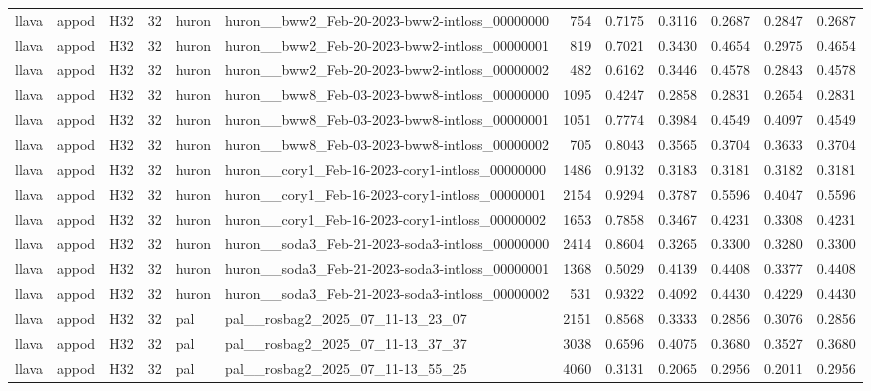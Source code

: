 \begin{table}[tbp]
\begin{tabular}{lllrllrrrrrr}
llava & appod & H32 & 32 & huron & huron\_\_bww2\_Feb-20-2023-bww2-intloss\_00000000 & 754 & 0.7175 & 0.3116 & 0.2687 & 0.2847 & 0.2687 \\
llava & appod & H32 & 32 & huron & huron\_\_bww2\_Feb-20-2023-bww2-intloss\_00000001 & 819 & 0.7021 & 0.3430 & 0.4654 & 0.2975 & 0.4654 \\
llava & appod & H32 & 32 & huron & huron\_\_bww2\_Feb-20-2023-bww2-intloss\_00000002 & 482 & 0.6162 & 0.3446 & 0.4578 & 0.2843 & 0.4578 \\
llava & appod & H32 & 32 & huron & huron\_\_bww8\_Feb-03-2023-bww8-intloss\_00000000 & 1095 & 0.4247 & 0.2858 & 0.2831 & 0.2654 & 0.2831 \\
llava & appod & H32 & 32 & huron & huron\_\_bww8\_Feb-03-2023-bww8-intloss\_00000001 & 1051 & 0.7774 & 0.3984 & 0.4549 & 0.4097 & 0.4549 \\
llava & appod & H32 & 32 & huron & huron\_\_bww8\_Feb-03-2023-bww8-intloss\_00000002 & 705 & 0.8043 & 0.3565 & 0.3704 & 0.3633 & 0.3704 \\
llava & appod & H32 & 32 & huron & huron\_\_cory1\_Feb-16-2023-cory1-intloss\_00000000 & 1486 & 0.9132 & 0.3183 & 0.3181 & 0.3182 & 0.3181 \\
llava & appod & H32 & 32 & huron & huron\_\_cory1\_Feb-16-2023-cory1-intloss\_00000001 & 2154 & 0.9294 & 0.3787 & 0.5596 & 0.4047 & 0.5596 \\
llava & appod & H32 & 32 & huron & huron\_\_cory1\_Feb-16-2023-cory1-intloss\_00000002 & 1653 & 0.7858 & 0.3467 & 0.4231 & 0.3308 & 0.4231 \\
llava & appod & H32 & 32 & huron & huron\_\_soda3\_Feb-21-2023-soda3-intloss\_00000000 & 2414 & 0.8604 & 0.3265 & 0.3300 & 0.3280 & 0.3300 \\
llava & appod & H32 & 32 & huron & huron\_\_soda3\_Feb-21-2023-soda3-intloss\_00000001 & 1368 & 0.5029 & 0.4139 & 0.4408 & 0.3377 & 0.4408 \\
llava & appod & H32 & 32 & huron & huron\_\_soda3\_Feb-21-2023-soda3-intloss\_00000002 & 531 & 0.9322 & 0.4092 & 0.4430 & 0.4229 & 0.4430 \\
llava & appod & H32 & 32 & pal & pal\_\_rosbag2\_2025\_07\_11-13\_23\_07 & 2151 & 0.8568 & 0.3333 & 0.2856 & 0.3076 & 0.2856 \\
llava & appod & H32 & 32 & pal & pal\_\_rosbag2\_2025\_07\_11-13\_37\_37 & 3038 & 0.6596 & 0.4075 & 0.3680 & 0.3527 & 0.3680 \\
llava & appod & H32 & 32 & pal & pal\_\_rosbag2\_2025\_07\_11-13\_55\_25 & 4060 & 0.3131 & 0.2065 & 0.2956 & 0.2011 & 0.2956 \\
\bottomrule
\end{tabular}
\end{table}
